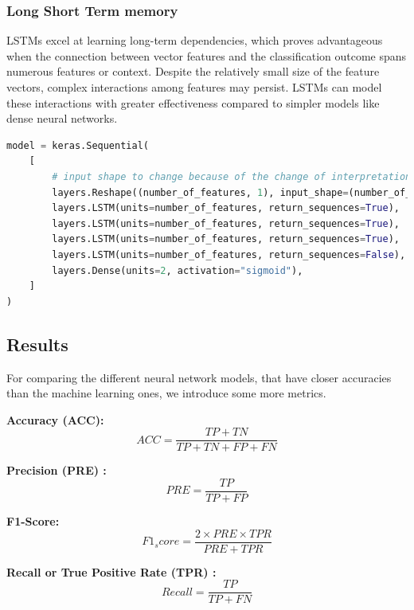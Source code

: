 \documentclass{article}
\begin{document}
    \subsubsection{Long Short Term memory}
    LSTMs excel at learning long-term dependencies, which proves advantageous when the connection between vector features and the classification outcome spans numerous features or context.
    Despite the relatively small size of the feature vectors, complex interactions among features may persist.
    LSTMs can model these interactions with greater effectiveness compared to simpler models like dense neural networks.

    \begin{lstlisting}[language=Python, caption=LSTM on feature vector architecture]
model = keras.Sequential(
    [
        # input shape to change because of the change of interpretation of the features
        layers.Reshape((number_of_features, 1), input_shape=(number_of_features,)),
        layers.LSTM(units=number_of_features, return_sequences=True),
        layers.LSTM(units=number_of_features, return_sequences=True),
        layers.LSTM(units=number_of_features, return_sequences=True),
        layers.LSTM(units=number_of_features, return_sequences=False),
        layers.Dense(units=2, activation="sigmoid"),
    ]
)
    \end{lstlisting}

    \subsection{Results}\label{subsec:results2}

    For comparing the different neural network models, that have closer accuracies than the machine learning ones, we introduce some more metrics.

    \textbf{Accuracy (ACC):}
    \[
        ACC = \frac{TP + TN}{TP + TN + FP + FN}
    \]

    \textbf{Precision (PRE) :}
    \[
        PRE = \frac{TP}{TP + FP}
    \]

    \textbf{ F1-Score:}
    \[
        F1_score = \frac{2 \times PRE \times TPR}{PRE + TPR}
    \]

    \textbf{Recall or True Positive Rate (TPR)  :}
    \[
        Recall = \frac{TP}{TP + FN}
    \]
\end{document}
